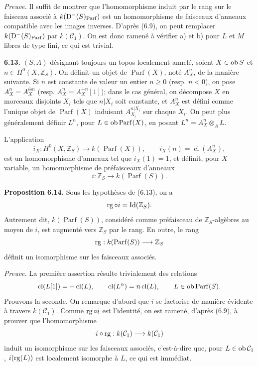 \documentclass[11pt]{article}
\newcommand{\cl}{\operatorname{cl}}
\newcommand{\Parf}{\operatorname{Parf}}
\begin{document}
\providecommand{\End}{\operatorname{End}}
\providecommand{\tr}{\operatorname{tr}}

\emph{Preuve.} Il suffit de montrer que l'homomorphisme induit par le rang sur le faisceau associé à \(k(\Dpx^-(S)_{\Parf})\) est un homomorphisme de faisceaux d'anneaux compatible avec les images inverses. D'après (6.9), on peut remplacer \(k(\Dpx^-(S)_{\Parf})\) par \(k(\mathcal C_1)\). On est donc ramené à vérifier a) et b) pour \(L\) et \(M\) libres de type fini, ce qui est trivial.

\textbf{6.13.} \((S,A)\) désignant toujours un topos localement annelé, soient \(X\in\operatorname{ob} S\) et \(n\in H^0(X,\mathbb Z_S)\). On définit un objet de \(\Parf(X)\), noté \(A_X^n\), de la manière suivante. Si \(n\) est constante de valeur un entier \(n\geq0\) (resp. \(n<0\)), on pose \(A_X^n=A_X^{\oplus n}\) (resp. \(A_X^n=A_X^{-n}[1]\)); dans le cas général, on décompose \(X\) en morceaux disjoints \(X_i\) tels que \(n|X_i\) soit constante, et \(A_X^n\) est défini comme l'unique objet de \(\Parf(X)\) induisant \(A_{X_i}^{n|X_i}\) sur chaque \(X_i\). On peut plus généralement définir \(L^n\), pour \(L\in\Ob\Parf(X)\), en posant \(L^n=A_X^n\otimes_AL\).

L'application
\[
  i_X:H^0(X,\mathbb Z_S)\longrightarrow k(\Parf(X)),
  \qquad i_X(n)=\cl(A_X^n),
\]
est un homomorphisme d'anneaux tel que \(i_X(1)=1\), et définit, pour \(X\) variable, un homomorphisme de préfaisceaux d'anneaux
\[
  i:\mathbb Z_S\longrightarrow k(\Parf(S)).
\]

\textbf{Proposition 6.14.} Sous les hypothèses de (6.13), on a
\[
  \operatorname{rg}\circ i=\operatorname{Id}(\mathbb Z_S).
\]
Autrement dit, \(k(\Parf(S))\), considéré comme préfaisceau de \(\mathbb Z_S\)-algèbres au moyen de \(i\), est augmenté vers \(\mathbb Z_S\) par le rang. En outre, le rang
\[
  \rg:k(\Parf(S))\longrightarrow\mathbb Z_S
\]
définit un isomorphisme sur les faisceaux associés.

\emph{Preuve.} La première assertion résulte trivialement des relations
\[
  \cl(L[1])=-\cl(L),\qquad \cl(L^n)=n\cl(L),
  \qquad L\in\Ob\Parf(S).
\]
Prouvons la seconde. On remarque d'abord que \(i\) se factorise de manière évidente à travers \(k(\mathcal C_1)\). Comme \(\operatorname{rg}\circ i\) est l'identité, on est ramené, d'après (6.9), à prouver que l'homomorphisme
\[
  i\circ\operatorname{rg}:k(\mathcal C_1)\longrightarrow k(\mathcal C_1)
\]
induit un isomorphisme sur les faisceaux associés, c'est-à-dire que, pour \(L\in\operatorname{ob}\mathcal C_1\), \(i(\operatorname{rg}(L))\) est localement isomorphe à \(L\), ce qui est immédiat.
\end{document}
